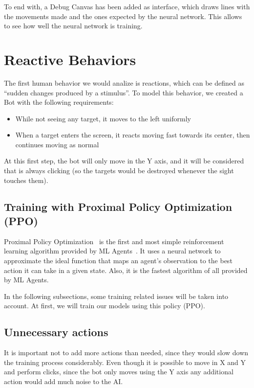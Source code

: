 To end with, a Debug Canvas has been added as interface, which draws lines with the movements made and the ones expected by the neural network. This allows to see how well the neural network is training.

\section{Reactive Behaviors}

The first human behavior we would analize is reactions, which can be defined as ``sudden changes produced by a stimulus''. To model this behavior, we created a Bot with the following requirements:

\begin{itemize}
 \item While not seeing any target, it moves to the left uniformly
 \item When a target enters the screen, it reacts moving fast towards its center, then continues moving as normal
\end{itemize}

At this first step, the bot will only move in the Y axis, and it will be considered that is always clicking (so the targets would be destroyed whenever the sight touches them).

\subsection{Training with Proximal Policy Optimization (PPO)}
\label{sec:trainingPPO}

Proximal Policy Optimization~\cite{ppopolicy} is the first and most simple reinforcement learning algorithm  provided by ML Agents~\cite{mlagents}. It uses a neural network to approximate the ideal function that maps an agent's observation to the best action it can take in a given state. Also, it is the fastest algorithm of all provided by ML Agents.

In the following subsections, some training related issues will be taken into account. At first, we will train our models using this policy (PPO).

\subsection{Unnecessary actions}
It is important not to add more actions than needed, since they would slow down the training process considerably. Even though it is possible to move in X and Y and perform clicks, since the bot only moves using the Y axis any additional action would add much noise to the AI. 

